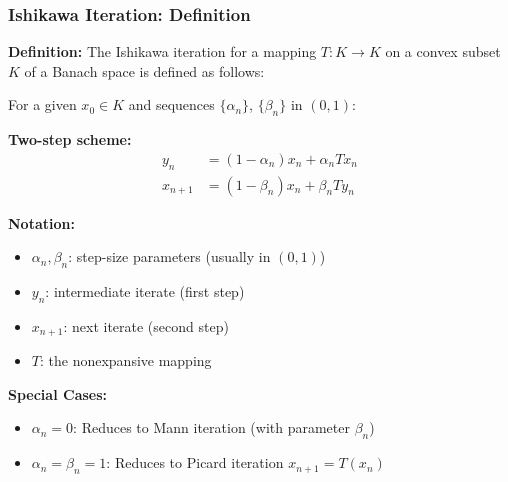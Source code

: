 \documentclass[aspectratio=169,10pt]{beamer}
\begin{document}
\begin{frame}
\frametitle{Ishikawa Iteration: Definition}

\textbf{Definition:} The Ishikawa iteration for a mapping $T: K \to K$ on a convex subset $K$
of a Banach space is defined as follows:

\vspace{0.3cm}

For a given $x_0 \in K$ and sequences $\{\alpha_n\}$, $\{\beta_n\}$ in $(0,1)$:

\vspace{0.15cm}

\textbf{Two-step scheme:}
\begin{align}
y_n &= (1 - \alpha_n) x_n + \alpha_n T x_n \label{eq:ishikawa1} \\
x_{n+1} &= (1 - \beta_n) x_n + \beta_n T y_n \label{eq:ishikawa2}
\end{align}

\vspace{0.3cm}

\textbf{Notation:}
\begin{itemize}
    \item $\alpha_n, \beta_n$: step-size parameters (usually in $(0, 1)$)
    \item $y_n$: intermediate iterate (first step)
    \item $x_{n+1}$: next iterate (second step)
    \item $T$: the nonexpansive mapping
\end{itemize}

\vspace{0.3cm}

\textbf{Special Cases:}
\begin{itemize}
    \item $\alpha_n = 0$: Reduces to Mann iteration (with parameter $\beta_n$)
    \item $\alpha_n = \beta_n = 1$: Reduces to Picard iteration $x_{n+1} = T(x_n)$
\end{itemize}

\end{frame}
\end{document}
